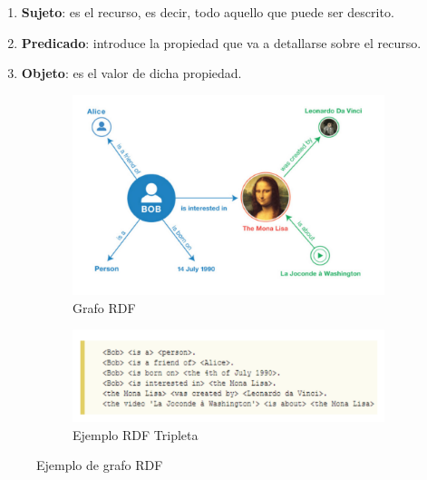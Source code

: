 \begin{enumerate}
	\item \textbf{Sujeto}: es el recurso, es decir, todo aquello que puede ser descrito.
	\item \textbf{Predicado}: introduce la propiedad que va a detallarse sobre el recurso.
	\item \textbf{Objeto}: es el valor de dicha propiedad.
\end{enumerate}


\begin{figure}[H]
	\centering
	\begin{subfigure}[h]{0.70\textwidth} 
		\includegraphics[width=\textwidth]{imagenes/capitulo3/grafoRDF}
		\caption{Grafo RDF}
	\end{subfigure}       
	\begin{subfigure}[h]{0.74\textwidth} 
		\includegraphics[width=\textwidth]{imagenes/capitulo3/ejemploRDF}
		\caption{Ejemplo RDF Tripleta}
	\end{subfigure}
	\caption{Ejemplo de grafo RDF \cite{aplicacion}}
	\label{fig:ejemploRDF}
\end{figure}

